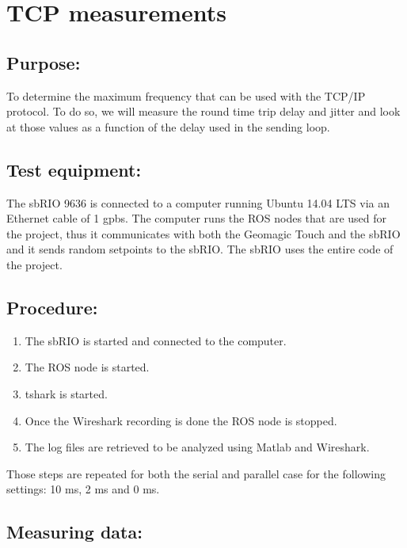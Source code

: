 \section{TCP measurements}\label{sec_tcp_mes}

\subsection*{Purpose:}

To determine the maximum frequency that can be used with the TCP/IP protocol. To do so, we will measure the round time trip delay and jitter and look at those values as a function of the delay used in the sending loop.

\subsection*{Test equipment:}

The sbRIO 9636 is connected to a computer running Ubuntu 14.04 LTS via an Ethernet cable of 1 gpbs. The computer runs the ROS nodes that are used for the project, thus it communicates with both the Geomagic Touch and the sbRIO and it sends random setpoints to the sbRIO. The sbRIO uses the entire code of the project.

\subsection*{Procedure:}

\begin{enumerate}
	\item The sbRIO is started and connected to the computer.
	\item The ROS node is started.
	\item tshark is started.%
	\item Once the Wireshark recording is done the ROS node is stopped.
	\item The log files are retrieved to be analyzed using Matlab and Wireshark.
\end{enumerate}
Those steps are repeated for both the serial and parallel case for the following settings: 10 ms, 2 ms and 0 ms.


\subsection*{Measuring data:}

